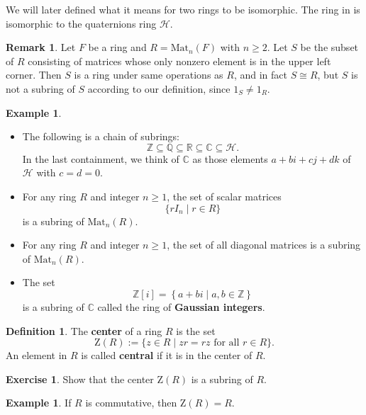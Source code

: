 \documentclass[12pt]{report}
\numberwithin{equation}{section}
\numberwithin{theorem}{chapter}
\theoremstyle{definition}
\newtheorem{definition}[theorem]{Definition}
\newtheorem{example}[theorem]{Example}
\newtheorem{exercise}{Exercise}
\newtheorem*{basic properties}{Basic Properties}
\newtheorem*{Important Remark}{Important Remark}
\newtheorem{remark}[theorem]{Remark}
\newcommand{\df}[1]{{\bf #1}\index{#1}}
\newcommand{\C}{\mathbb{C}}
\begin{document}
We will later defined what it means for two rings to be isomorphic. The ring in  is isomorphic to the quaternions ring $\mathcal{H}$. 


\begin{remark}
Let $F$ be a ring and $R = \mathrm{Mat}_{n}(F)$ with $n \geqslant 2$. Let $S$ be the subset of $R$ consisting of matrices whose only nonzero element is in the upper left corner. Then $S$ is a ring under same operations as $R$, and in fact $S \cong R$, but $S$ is not a subring of $S$ according to our definition, since $1_S \neq 1_R$.
\end{remark}



\begin{example}
\begin{itemize}[itemsep=0.1em]
\item The following is a chain of subrings:
$$\mathbb{Z} \subseteq \mathbb{Q} \subseteq \mathbb{R} \subseteq \C \subseteq \mathcal{H}.$$
In the last containment, we think of $\C$ as those elements $a + bi + cj + dk$ of
  $\mathcal{H}$ with $c=d=0$.
\item For any ring $R$ and integer $n \geqslant 1$, the set of scalar matrices
$$\{ rI_n \mid r \in R \}$$ 
is a subring of $\mathrm{Mat}_{n}(R)$.
 \item For any ring $R$ and integer $n \geqslant 1$, the set of all diagonal matrices is a subring of $\mathrm{Mat}_{n}(R)$. 
\item The set 
$$\mathbb{Z}[i]=\left \{ a+bi\mid a,b \in \mathbb{Z} \right\}$$ 
is a subring of $\C$ called the ring of \df{Gaussian integers}.
\end{itemize}
\end{example}


\begin{definition}
The {\bf center} of a ring $R$ is the set
$$\mathrm{Z}(R) := \{z \in R \mid zr = rz \text{ for all } r \in R\}.$$
An element in $R$ is called {\bf central} if it is in the center of $R$.
\end{definition}

\begin{exercise}
Show that the center $\mathrm{Z}(R)$ is a subring of $R$.
\end{exercise}


\begin{example}
	If $R$ is commutative, then $\mathrm{Z}(R) = R$.
\end{example}
\end{document}
